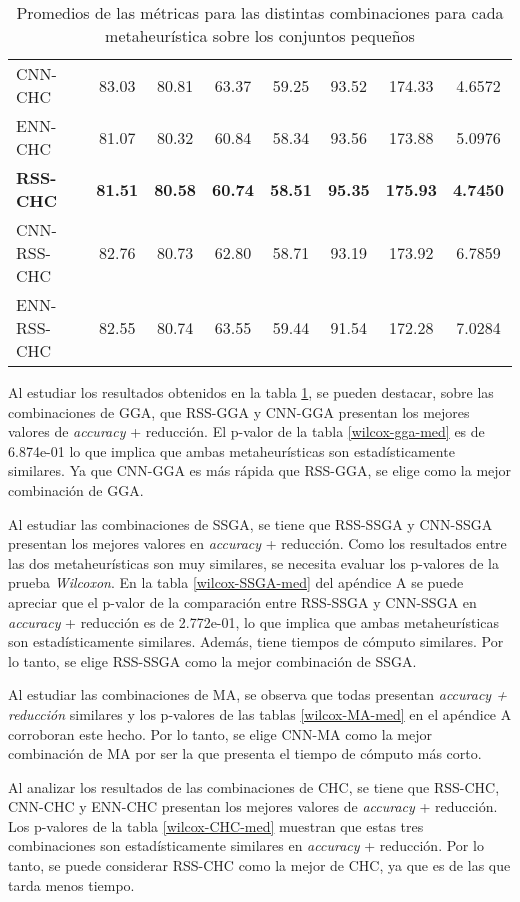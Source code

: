 \begin{table}[h!]
\begin{adjustbox}{max width =\textwidth}
\begin{tabular}{l c c c c c c c}
\hline

CNN-CHC & 83.03 & 80.81 & 63.37 & 59.25 & 93.52 & 174.33 & 4.6572 \\
ENN-CHC & 81.07 & 80.32 & 60.84 & 58.34 & 93.56 & 173.88 & 5.0976 \\
\textbf{RSS-CHC} & \textbf{81.51} & \textbf{80.58} & \textbf{60.74} & \textbf{58.51} & \textbf{95.35} & \textbf{175.93} & \textbf{4.7450} \\
CNN-RSS-CHC & 82.76 & 80.73 & 62.80 & 58.71 & 93.19 & 173.92 & 6.7859 \\
ENN-RSS-CHC  & 82.55 & 80.74 & 63.55 & 59.44 & 91.54 & 172.28 & 7.0284 \\


\hline
\end{tabular}
\end{adjustbox}
\caption{Promedios de las métricas para las distintas combinaciones para cada metaheurística sobre los conjuntos pequeños}
\label{med-all}

\end{table}

Al estudiar los resultados obtenidos en la tabla \ref{med-all}, se pueden destacar, sobre las combinaciones de GGA, que RSS-GGA y CNN-GGA presentan los mejores valores de \emph{accuracy} + reducción. El p-valor de la tabla \ref{wilcox-gga-med} es de 6.874e-01 lo que implica que ambas metaheurísticas son estadísticamente similares. Ya que CNN-GGA es más rápida que RSS-GGA, se elige como la mejor combinación de GGA.

Al estudiar las combinaciones de SSGA, se tiene que RSS-SSGA y CNN-SSGA presentan los mejores valores en \emph{accuracy} + reducción. Como los resultados entre las dos metaheurísticas son muy similares, se necesita evaluar los p-valores de la prueba \emph{Wilcoxon}. En la tabla \ref{wilcox-SSGA-med} del apéndice A se puede apreciar que el p-valor de la comparación entre RSS-SSGA y CNN-SSGA en \emph{accuracy} + reducción es de 2.772e-01, lo que implica que ambas metaheurísticas son estadísticamente similares. Además, tiene tiempos de cómputo similares. Por lo tanto, se elige RSS-SSGA como la mejor combinación de SSGA.

Al estudiar las combinaciones de MA, se observa que todas presentan \emph{accuracy + reducción} similares y los p-valores de las tablas \ref{wilcox-MA-med} en el apéndice A corroboran este hecho. Por lo tanto, se elige CNN-MA como la mejor combinación de MA por ser la que presenta el tiempo de cómputo más corto.

Al analizar los resultados de las combinaciones de CHC, se tiene que RSS-CHC, CNN-CHC y ENN-CHC presentan los mejores valores de \emph{accuracy} + reducción. Los p-valores de la tabla \ref{wilcox-CHC-med} muestran que estas tres combinaciones son estadísticamente similares en \emph{accuracy} + reducción. Por lo tanto, se puede considerar RSS-CHC como la mejor de CHC, ya que es de las que tarda menos tiempo.

